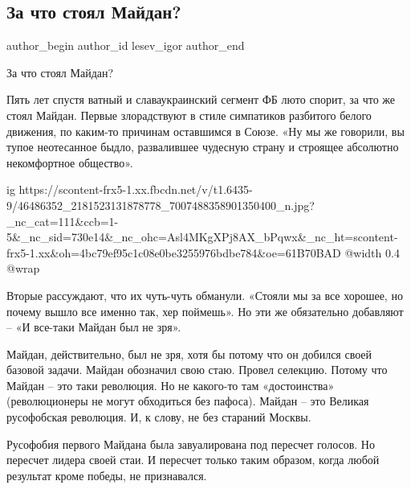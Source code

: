  
 
 
 
 
 
\subsection{За что стоял Майдан?}
\label{sec:21_11_2018.fb.lesev_igor.1.za_chto_stojal_maidan}
 
\ifcmt
 author_begin
   author_id lesev_igor
 author_end
\fi

За что стоял Майдан?

Пять лет спустя ватный и славаукраинский сегмент ФБ люто спорит, за что же
стоял Майдан. Первые злорадствуют в стиле симпатиков разбитого белого движения,
по каким-то причинам оставшимся в Союзе. «Ну мы же говорили, вы тупое
неотесанное быдло, развалившее чудесную страну и строящее абсолютно
некомфортное общество».

\ifcmt
  ig https://scontent-frx5-1.xx.fbcdn.net/v/t1.6435-9/46486352_2181523131878778_7007488358901350400_n.jpg?_nc_cat=111&ccb=1-5&_nc_sid=730e14&_nc_ohc=Asl4MKgXPj8AX_bPqwx&_nc_ht=scontent-frx5-1.xx&oh=4bc79ef95c1c08e0be3255976bdbe784&oe=61B70BAD
  @width 0.4
  @wrap 
\fi

Вторые рассуждают, что их чуть-чуть обманули. «Стояли мы за все хорошее, но
почему вышло все именно так, хер поймешь». Но эти же обязательно добавляют – «И
все-таки Майдан был не зря».

Майдан, действительно, был не зря, хотя бы потому что он добился своей базовой
задачи. Майдан обозначил свою стаю. Провел селекцию. Потому что Майдан – это
таки революция. Но не какого-то там «достоинства» (революционеры не могут
обходиться без пафоса). Майдан – это Великая русофобская революция. И, к слову,
не без стараний Москвы.

Русофобия первого Майдана была завуалирована под пересчет голосов. Но пересчет
лидера своей стаи. И пересчет только таким образом, когда любой результат кроме
победы, не признавался.

